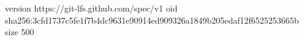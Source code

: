 version https://git-lfs.github.com/spec/v1
oid sha256:3cfd1737c5fe1f7b4dc9631e90914ed909326a1849b205edaf12f6525253665b
size 500
